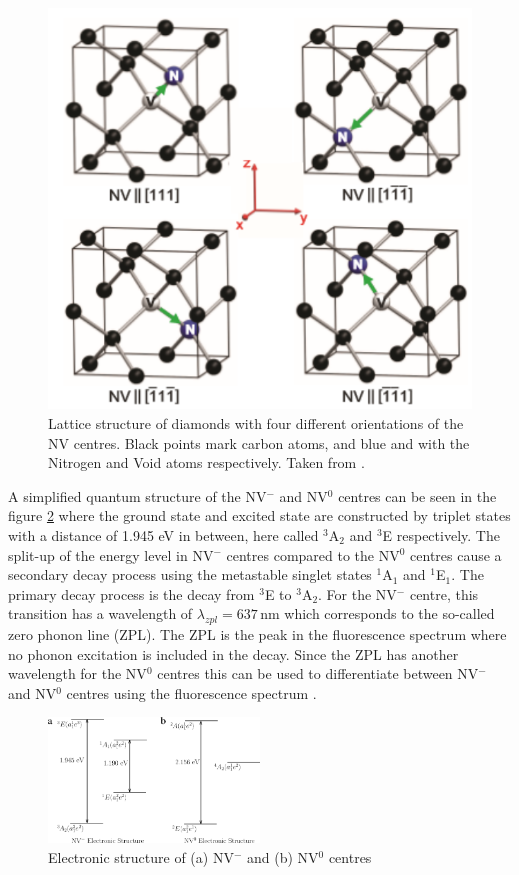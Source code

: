  \begin{figure}
 	\centering
 	\includegraphics[width=0.7\linewidth]{../figures/NClatt}
 	\caption[Different orientations of the NV centres]{Lattice structure of diamonds with four different orientations of the NV centres. Black points mark carbon atoms, and blue and with the Nitrogen and Void atoms respectively. Taken from \cite{pham_magnetic_nodate}.}
 	\label{fig:nclatt}
 \end{figure}
 
 A simplified quantum structure of the NV$^-$ and NV$^0$ centres can be seen in the figure \ref{fig:nvcentres} where the ground state and excited state are constructed by triplet states with a distance of 1.945 eV in between, here called $^{3}$A$_{2}$ and $^{3}$E respectively. The split-up of the energy level in NV$^-$ centres compared to the NV$^0$ centres cause a secondary decay process using the metastable singlet states $^1$A$_1$ and $^1$E$_1$. The primary decay process is the decay from $^{3}$E to $^{3}$A$_{2}$. For the NV$^-$ centre, this transition has a wavelength of $\lambda_{zpl} = 637\,\mathrm{nm}$ which corresponds to the so-called zero phonon line (ZPL). The ZPL is the peak in the fluorescence spectrum where no phonon excitation is included in the decay. Since the ZPL has another wavelength for the NV$^0$ centres this can be used to differentiate between NV$^-$ and NV$^0$ centres using the fluorescence spectrum \cite{schirhagl_nitrogen-vacancy_2014}.\\

\begin{figure}
	
	\centering
	\includegraphics[width=0.5\textwidth]{../figures/nv-centre.png}
	\caption{Electronic structure of (a) NV$^-$ and (b) NV$^0$ centres \cite{doherty}}
	\label{fig:nvcentres}
\end{figure}


